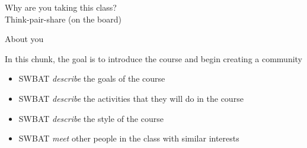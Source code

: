 \documentclass{beamer}
\newcommand{\goals}{
\begin{itemize}
\item SWBAT \emph{describe} the goals of the course
\item SWBAT \emph{describe} the activities that they will do in the course
\item SWBAT \emph{describe} the style of the course
\item SWBAT \emph{meet} other people in the class with similar interests
\end{itemize}
}
\begin{document}
\begin{frame}

Why are you taking this class?\\
Think-pair-share (on the board)

\end{frame}
\begin{frame}

About you

\end{frame}
\begin{frame}

In this chunk, the goal is to introduce the course and begin creating a community

\goals

\end{frame}


\end{document}
